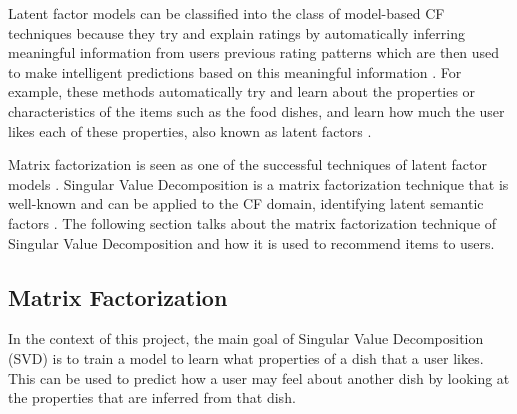 
Latent factor models can be classified into the class of model-based CF techniques because they try and explain ratings by automatically inferring meaningful information from users previous rating patterns which are then used to make intelligent predictions based on this meaningful information \cite{survey}. For example, these methods automatically try and learn about the properties or characteristics of the items such as the food dishes, and learn how much the user likes each of these properties, also known as latent factors \cite{koren2011}. 

Matrix factorization is seen as one of the successful techniques of latent factor models \cite{memorybased, koren2009matrix}. Singular Value Decomposition is a matrix factorization technique that is well-known and can be applied to the CF domain, identifying latent semantic factors \cite{koren2009matrix}. The following section talks about the matrix factorization technique of Singular Value Decomposition and how it is used to recommend items to users. 


\subsection{Matrix Factorization}


In the context of this project, the main goal of Singular Value Decomposition (SVD) is to train a model to learn what properties of a dish that a user likes. This can be used to predict how a user may feel about another dish by looking at the properties that are inferred from that dish.


